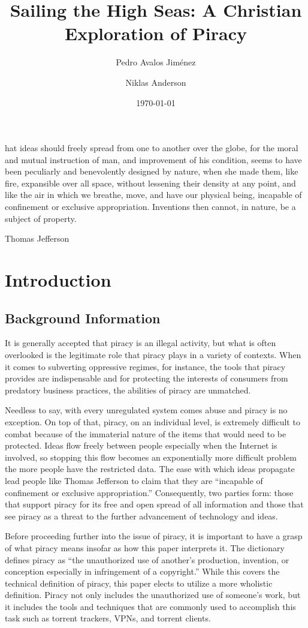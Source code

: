 \documentclass[onecolumn, 12pt]{article}
\title{Sailing the High Seas: A Christian Exploration of Piracy}
\author{Pedro Avalos Jim\'enez}
\author{Niklas Anderson}
\affil{Wheaton College}
\date{\today}
\begin{document}
\begin{refsection}
\maketitle
\epigraph{%
  hat ideas should freely spread from one to another over the globe,
  for the moral and mutual instruction of man, and improvement of his
  condition, seems to have been peculiarly and benevolently designed by nature,
  when she made them, like fire, expansible over all space, without lessening
  their density at any point, and like the air in which we breathe, move, and
  have our physical being, incapable of confinement or exclusive appropriation.
  Inventions then cannot, in nature, be a subject of property.%
}{Thomas Jefferson~\cite{barlow:wine}}


\section{Introduction}
\subsection{Background Information}
It is generally accepted that piracy is an illegal activity, but what is often overlooked
is the legitimate role that piracy plays in a variety of contexts. When it comes to
subverting oppressive regimes, for instance, the tools that piracy provides are
indispensable and for protecting the interests of consumers from predatory business
practices, the abilities of piracy are unmatched. 

Needless to say, with every unregulated system comes abuse and piracy is no exception.
On top of that, piracy, on an individual level, is extremely difficult to combat because
of the immaterial nature of the items that would need to be protected. Ideas flow freely
between people especially when the Internet is involved, so stopping this flow becomes an
exponentially more difficult problem the more people have the restricted data. The ease
with which ideas propagate lead people like Thomas Jefferson to claim that they are
``incapable of confinement or exclusive appropriation.'' Consequently, two parties form:
those that support piracy for its free and open spread of all information and those that
see piracy as a threat to the further advancement of technology and ideas.

Before proceeding further into the issue of piracy, it is important to have a grasp of
what piracy means insofar as how this paper interprets it. The dictionary defines piracy
as ``the unauthorized use of another's production, invention, or conception especially in
infringement of a copyright.'' While this covers the technical definition of piracy, this
paper elects to utilize a more wholistic definition. Piracy not only includes the
unauthorized use of someone's work, but it includes the tools and techniques that are
commonly used to accomplish this task such as torrent trackers, VPNs, and torrent clients.


\end{refsection}
\end{document}

